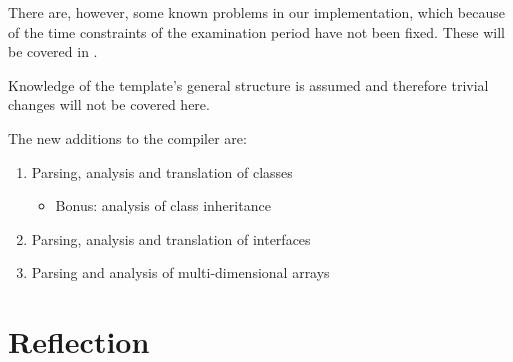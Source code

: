 \documentclass[]{tukportfolio}
\begin{document}
There are, however, some known problems in our implementation, which because of the time constraints of the examination period
have not been fixed. These will be covered in .

Knowledge of the template's general structure is assumed and therefore trivial changes will not be covered here.

The new additions to the compiler are:
\begin{enumerate}
  \item Parsing, analysis and translation of classes
  \begin{itemize}
    \item Bonus: analysis of class inheritance     
  \end{itemize}
  \item Parsing, analysis and translation of interfaces
  \item Parsing and analysis of multi-dimensional arrays
\end{enumerate}







\newpage

\part*{Reflection}



\newpage
\nocite{*}


\end{document}
